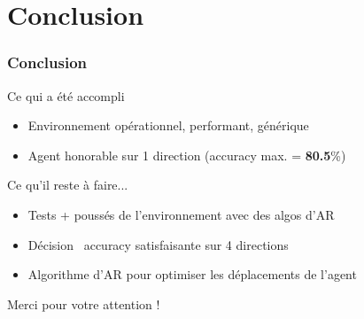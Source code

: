 \documentclass{beamer}
\begin{document}
\section*{Conclusion}

\begin{frame}
    \frametitle{Conclusion}
    \begin{block}{Ce qui a été accompli}
        \begin{itemize}
            \item Environnement opérationnel, performant, générique
            \item Agent honorable sur 1 direction (accuracy max. = \textbf{80.5}\%)
        \end{itemize}
    \end{block}
    \begin{block}{Ce qu'il reste à faire...}
        \begin{itemize}
            \item Tests + poussés de l'environnement avec des algos d'AR
            \item Décision \textrightarrow~accuracy satisfaisante sur 4 directions
            \item Algorithme d'AR pour optimiser les déplacements de l'agent
        \end{itemize}
    \end{block}
    Merci pour votre attention !
\end{frame}
\end{document}
